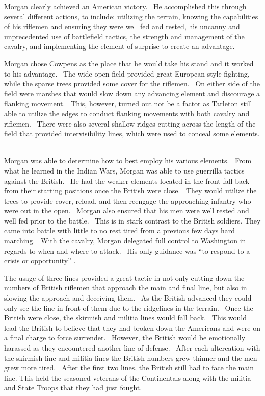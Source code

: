Morgan clearly achieved an American victory.  He accomplished this through
several different actions, to include: utilizing the terrain, knowing the
capabilities of his riflemen and ensuring they were well fed and rested, his
uncanny and unprecedented use of battlefield tactics, the strength and
management of the cavalry, and implementing the element of surprise to create an
advantage.  

Morgan chose Cowpens as the place that he would take his stand and it worked to
his advantage.  The wide-open field provided great European style fighting,
while the sparse trees provided some cover for the riflemen.  On either side of
the field were marshes that would slow down any advancing element and discourage
a flanking movement.  This, however, turned out not be a factor as Tarleton
still able to utilize the edges to conduct flanking movements with both cavalry
and riflemen.  There were also several shallow ridges cutting across the length
of the field that provided intervisibility lines, which were used to conceal
some elements.  

Morgan was able to determine how to best employ his various elements.  From what
he learned in the Indian Wars, Morgan was able to use guerrilla tactics against
the British.  He had the weaker elements located in the front fall back from
their starting positions once the British were close.  They would utilize the
trees to provide cover, reload, and then reengage the approaching infantry who
were out in the open.  Morgan also ensured that his men were well rested and
well fed prior to the battle.  This is in stark contrast to the British
soldiers.  They came into battle with little to no rest tired from a previous
few days hard marching.  With the cavalry, Morgan delegated full control to
Washington in regards to when and where to attack.  His only guidance was “to
respond to a crisis or opportunity” \cite[p.125]{babits_devil_2001}.  

The usage of three lines provided a great tactic in not only cutting down the
numbers of British riflemen that approach the main and final line, but also in
slowing the approach and deceiving them.  As the British advanced they could
only see the line in front of them due to the ridgelines in the terrain.  Once
the British were close, the skirmish and militia lines would fall back.  This
would lead the British to believe that they had broken down the Americans and
were on a final charge to force surrender.  However, the British would be
emotionally harassed as they encountered another line of defense.  After each
altercation with the skirmish line and militia lines the British numbers grew
thinner and the men grew more tired.  After the first two lines, the British
still had to face the main line.  This held the seasoned veterans of the
Continentals along with the militia and State Troops that they had just fought.
 

